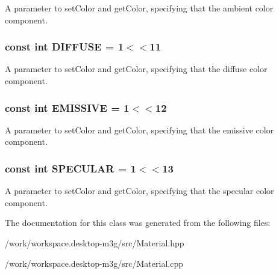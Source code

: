 A parameter to setColor and getColor, specifying that the ambient color component. \hypertarget{classm3g_1_1Material_9798073e44254569f47464dc6bf5da89}{
\subsubsection[{DIFFUSE}]{\setlength{\rightskip}{0pt plus 5cm}const int {\bf DIFFUSE} = 1$<$$<$11}}
\label{classm3g_1_1Material_9798073e44254569f47464dc6bf5da89}


A parameter to setColor and getColor, specifying that the diffuse color component. \hypertarget{classm3g_1_1Material_b92d57adf6955eae6adac15e865659cd}{
\subsubsection[{EMISSIVE}]{\setlength{\rightskip}{0pt plus 5cm}const int {\bf EMISSIVE} = 1$<$$<$12}}
\label{classm3g_1_1Material_b92d57adf6955eae6adac15e865659cd}


A parameter to setColor and getColor, specifying that the emissive color component. \hypertarget{classm3g_1_1Material_cac20b25665d9a3713bec3a772a89ede}{
\subsubsection[{SPECULAR}]{\setlength{\rightskip}{0pt plus 5cm}const int {\bf SPECULAR} = 1$<$$<$13}}
\label{classm3g_1_1Material_cac20b25665d9a3713bec3a772a89ede}


A parameter to setColor and getColor, specifying that the specular color component. 

The documentation for this class was generated from the following files:\begin{CompactItemize}
\item 
/work/workspace.desktop-m3g/src/Material.hpp\item 
/work/workspace.desktop-m3g/src/Material.cpp\end{CompactItemize}
